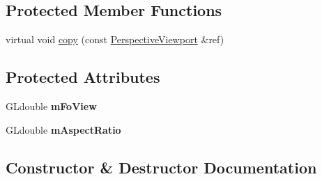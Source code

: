 \subsection*{Protected Member Functions}
\begin{DoxyCompactItemize}
\item 
virtual void \mbox{\hyperlink{class_geometry_engine_1_1_geometry_item_utils_1_1_perspective_viewport_af751fd63329fb5f80965e3f864afb4b7}{copy}} (const \mbox{\hyperlink{class_geometry_engine_1_1_geometry_item_utils_1_1_perspective_viewport}{Perspective\+Viewport}} \&ref)
\end{DoxyCompactItemize}
\subsection*{Protected Attributes}
\begin{DoxyCompactItemize}
\item 
\mbox{\label{class_geometry_engine_1_1_geometry_item_utils_1_1_perspective_viewport_a1bc99a06c49f91aa2e9638506000fa88}} 
G\+Ldouble {\bfseries m\+Fo\+View}
\item 
\mbox{\label{class_geometry_engine_1_1_geometry_item_utils_1_1_perspective_viewport_ac1c919889b6d566d796196d46cc36d47}} 
G\+Ldouble {\bfseries m\+Aspect\+Ratio}
\end{DoxyCompactItemize}


\subsection{Constructor \& Destructor Documentation}
\mbox{\label{class_geometry_engine_1_1_geometry_item_utils_1_1_perspective_viewport_af8f86542b7ad6a8b91a3d659d3d2f933}} 
